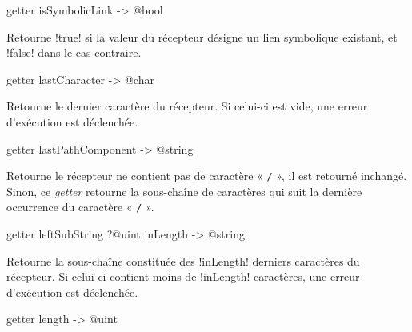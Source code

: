 
\begin{galgasbox}
getter isSymbolicLink -> @bool
\end{galgasbox}

Retourne \ggs!true! si la valeur du récepteur désigne un lien symbolique existant, et \ggs!false! dans le cas contraire.









\begin{galgasbox}
getter lastCharacter -> @char
\end{galgasbox}

Retourne le dernier caractère du récepteur. Si celui-ci est vide, une erreur d'exécution est déclenchée.









\begin{galgasbox}
getter lastPathComponent -> @string
\end{galgasbox}

Retourne le récepteur ne contient pas de caractère « \texttt{/} », il est retourné inchangé. Sinon, ce \emph{getter} retourne la sous-chaîne de caractères qui suit la dernière occurrence du caractère « \texttt{/} ».









\begin{galgasbox}
getter leftSubString ?@uint inLength -> @string
\end{galgasbox}

Retourne la sous-chaîne constituée des \ggs!inLength! derniers caractères du récepteur. Si celui-ci contient moins de \ggs!inLength! caractères, une erreur d'exécution est déclenchée.









\begin{galgasbox}
getter length -> @uint
\end{galgasbox}

